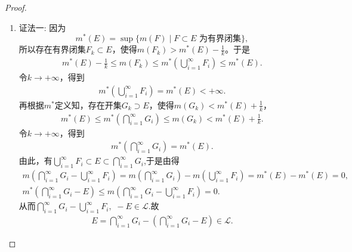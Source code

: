 \documentclass[../../main.tex]{subfiles}%
\begin{document}
\begin{proof}
\begin{enumerate}[(1)]
\item {\color{blue}证法一:} 因为
\[
m^*(E) = \sup\{m(F) \mid F\subset E\text{ 为有界闭集}\},
\]
所以存在有界闭集$F_k\subset E$，使得$m(F_k)>m^*(E)-\frac{1}{k}$。于是
\begin{align*}
m^*(E)-\frac{1}{k} \leqslant m(F_k) \leqslant m^*\left(\bigcup_{i=1}^{\infty}F_i\right) \leqslant m^*(E).
\end{align*}
令$k\to+\infty$，得到
\begin{align*}
m^*\left(\bigcup_{i=1}^{\infty}F_i\right) = m^*(E)<+\infty.
\end{align*}
再根据$m^*$定义知，存在开集$G_k\supset E$，使得$m(G_k)<m^*(E)+\frac{1}{k}$，
\begin{align*}
m^*(E) \leqslant m^*\left(\bigcap_{i=1}^{\infty}G_i\right) \leqslant m(G_k) < m^*(E)+\frac{1}{k}.
\end{align*}
令$k\to+\infty$，得到
\begin{align*}
m^*\left(\bigcap_{i=1}^{\infty}G_i\right) = m^*(E).
\end{align*}
由此，有$\bigcup_{i=1}^{\infty}F_i \subset E \subset \bigcap_{i=1}^{\infty}G_i$,于是由得
\begin{gather*}
m\left(\bigcap_{i=1}^{\infty}G_i - \bigcup_{i=1}^{\infty}F_i\right) = m\left(\bigcap_{i=1}^{\infty}G_i\right)-m\left(\bigcup_{i=1}^{\infty}F_i\right) = m^*(E)-m^*(E)=0, \\
m^*\left( \bigcap_{i=1}^{\infty}{G_i}-E \right) \leqslant m\left( \bigcap_{i=1}^{\infty}{G_i}-\bigcup_{i=1}^{\infty}{F_i} \right) =0.
\end{gather*}
从而$\bigcap_{i=1}^{\infty}{G_i}-\bigcup_{i=1}^{\infty}{F_i},\,\,-E\in \mathscr{L} .$故
\begin{align*}
E = \bigcap_{i=1}^{\infty}G_i - \left(\bigcap_{i=1}^{\infty}G_i - E\right)\in\mathscr{L}.
\end{align*}


\end{enumerate}
\end{proof}
\end{document}
